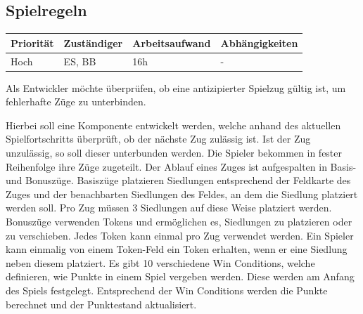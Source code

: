 \documentclass[a4paper]{scrreprt}
\newenvironment{requirement}[5] {
	\subsection{#1}
	\begin{tabularx}{\textwidth}{|X|l|X|X|}
		\hline
		Priorität & Zuständiger & Arbeitsaufwand & Abhängigkeiten \\
		\hline
		#2 & #3 & #4 & #5 \\
		\hline
	\end{tabularx}
	}{
	\newpage
	}
\begin{document}
\begin{requirement}{Spielregeln}{Hoch}{ES, BB}{16h}{-}

\begin{center}
	Als Entwickler möchte überprüfen, ob eine antizipierter Spielzug gültig ist, um fehlerhafte Züge zu unterbinden.
\end{center}

Hierbei soll eine Komponente entwickelt werden, welche anhand des aktuellen Spielfortschritts überprüft, ob der nächste Zug zulässig ist.
Ist der Zug unzulässig, so soll dieser unterbunden werden.
Die Spieler bekommen in fester Reihenfolge ihre Züge zugeteilt.
Der Ablauf eines Zuges ist aufgespalten in Basis- und Bonuszüge.
Basiszüge platzieren Siedlungen entsprechend der Feldkarte des Zuges und der benachbarten Siedlungen des Feldes, an dem die Siedlung platziert werden soll. Pro Zug müssen 3 Siedlungen auf diese Weise platziert werden.
Bonuszüge verwenden Tokens und ermöglichen es, Siedlungen zu platzieren oder zu verschieben. Jedes Token kann einmal pro Zug verwendet werden.
Ein Spieler kann einmalig von einem Token-Feld ein Token erhalten, wenn er eine Siedlung neben diesem platziert.
Es gibt 10 verschiedene Win Conditions, welche definieren, wie Punkte in einem Spiel vergeben werden. Diese werden am Anfang des Spiels festgelegt. Entsprechend der Win Conditions werden die Punkte berechnet und der Punktestand aktualisiert.


\end{requirement}
\end{document}

